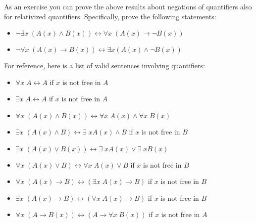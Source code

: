 \documentclass[letterpaper,10pt,english]{sphinxmanual}
\begin{document}
\sphinxAtStartPar
As an exercise you can prove the above results about negations of quantifiers also for relativized quantifiers. Specifically, prove the following statements:
\begin{itemize}
\item {} 
\sphinxAtStartPar
\(\neg \exists x \; (A(x) \wedge B(x)) \leftrightarrow \forall x \; ( A(x) \to \neg B(x))\)

\item {} 
\sphinxAtStartPar
\(\neg \forall x \; (A(x) \to B(x)) \leftrightarrow \exists x (A(x) \wedge \neg B(x))\)

\end{itemize}

\sphinxAtStartPar
For reference, here is a list of valid sentences involving quantifiers:
\begin{itemize}
\item {} 
\sphinxAtStartPar
\(\forall x \; A \leftrightarrow A\) if \(x\) is not free in \(A\)

\item {} 
\sphinxAtStartPar
\(\exists x \; A \leftrightarrow A\) if \(x\) is not free in \(A\)

\item {} 
\sphinxAtStartPar
\(\forall x \; (A(x) \land B(x)) \leftrightarrow \forall x \; A(x) \land \forall x \; B(x)\)

\item {} 
\sphinxAtStartPar
\(\exists x \; (A(x) \land B) \leftrightarrow \exists \; x A(x) \land B\) if \(x\) is not free in \(B\)

\item {} 
\sphinxAtStartPar
\(\exists x \; (A(x) \lor B(x)) \leftrightarrow \exists \; x A(x) \lor \exists \; x B(x)\)

\item {} 
\sphinxAtStartPar
\(\forall x \; (A(x) \lor B) \leftrightarrow \forall x \; A(x) \lor B\) if \(x\) is not free in \(B\)

\item {} 
\sphinxAtStartPar
\(\forall x \; (A(x) \to B) \leftrightarrow (\exists x \; A(x) \to B)\) if \(x\) is not free in \(B\)

\item {} 
\sphinxAtStartPar
\(\exists x \; (A(x) \to B) \leftrightarrow (\forall x \; A(x) \to B)\) if \(x\) is not free in \(B\)

\item {} 
\sphinxAtStartPar
\(\forall x \; (A \to B(x)) \leftrightarrow (A \to \forall x \; B(x))\) if \(x\) is not free in \(A\)


\end{itemize}
\end{document}
